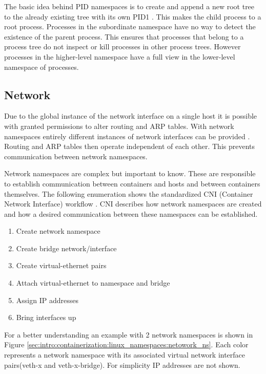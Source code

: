 The basic idea behind PID namespaces is to create and append a new root tree to the already existing tree with its own PID1 \cite{pidns}. 
This makes the child process to a root process.
Processes in the subordinate namespace have no way to detect the existence of the parent process. 
This ensures that processes that belong to a process tree do not inspect or kill processes in other process trees. 
However processes in the higher-level namespace have a full view in the lower-level namespace of processes.

\subsection{Network}
\label{sec:intro:containerization:linux_namespaces:network_namespaces}
Due to the global instance of the network interface on a single host it is possible with granted permissions to alter routing and ARP tables. 
With network namespaces entirely different instances of network interfaces can be provided \cite{nwns}. 
Routing and ARP tables then operate independent of each other. 
This prevents communication between network namespaces.
 
Network namespaces are complex but important to know. 
These are responsible to establish communication between containers and hosts and between containers themselves. 
The following enumeration shows the standardized CNI (Container Network Interface) workflow \cite{Charles2013}. 
CNI describes how network namespaces are created and how a desired communication between these namespaces can be established.

\begin{enumerate}
\item Create network namespace
\item Create bridge network/interface
\item Create virtual-ethernet pairs
\item Attach virtual-ethernet to namespace and bridge
\item Assign IP addresses
\item Bring interfaces up
\end{enumerate}
For a better understanding an example with 2 network namespaces is shown in Figure \ref{sec:intro:containerization:linux_namespaces:netowork_ns}. 
Each color represents a network namespace with its associated virtual network interface pairs(veth-x and veth-x-bridge). 
For simplicity IP addresses are not shown. 

